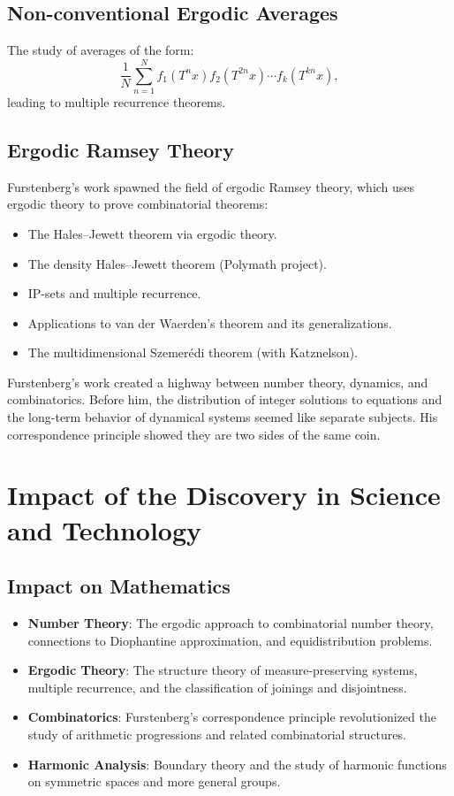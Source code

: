 \subsection{Non-conventional Ergodic Averages}
The study of averages of the form:
\[
\frac{1}{N} \sum_{n=1}^N f_1(T^n x) f_2(T^{2n} x) \cdots f_k(T^{kn} x),
\]
leading to multiple recurrence theorems.

\subsection{Ergodic Ramsey Theory}

Furstenberg's work spawned the field of ergodic Ramsey theory, which uses ergodic theory to prove combinatorial theorems:
\begin{itemize}
\item The Hales--Jewett theorem via ergodic theory.
\item The density Hales--Jewett theorem (Polymath project).
\item IP-sets and multiple recurrence.
\item Applications to van der Waerden's theorem and its generalizations.
\item The multidimensional Szemer\'edi theorem (with Katznelson).
\end{itemize}

\begin{whyitmatters}
Furstenberg's work created a highway between number theory, dynamics, and combinatorics. Before him, the distribution of integer solutions to equations and the long-term behavior of dynamical systems seemed like separate subjects. His correspondence principle showed they are two sides of the same coin.
\end{whyitmatters}

\section{Impact of the Discovery in Science and Technology}

\subsection{Impact on Mathematics}

\begin{itemize}
\item \textbf{Number Theory}: The ergodic approach to combinatorial number theory, connections to Diophantine approximation, and equidistribution problems.
\item \textbf{Ergodic Theory}: The structure theory of measure-preserving systems, multiple recurrence, and the classification of joinings and disjointness.
\item \textbf{Combinatorics}: Furstenberg's correspondence principle revolutionized the study of arithmetic progressions and related combinatorial structures.
\item \textbf{Harmonic Analysis}: Boundary theory and the study of harmonic functions on symmetric spaces and more general groups.
\end{itemize}

